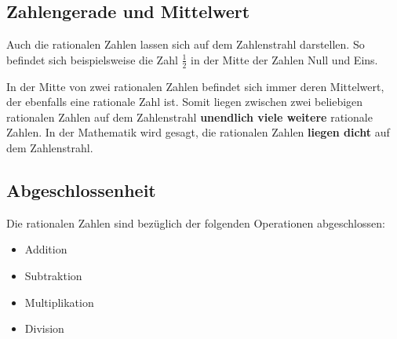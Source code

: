 \subsection{Zahlengerade und Mittelwert}

Auch die rationalen Zahlen lassen sich auf dem Zahlenstrahl darstellen. So befindet sich beispielsweise die Zahl $\frac{1}{2}$ in der Mitte der Zahlen Null und Eins.

\begin{center}
\end{center}

In der Mitte von zwei rationalen Zahlen befindet sich immer deren Mittelwert, der ebenfalls eine rationale Zahl ist. Somit liegen zwischen zwei beliebigen rationalen Zahlen auf dem Zahlenstrahl \textbf{unendlich viele weitere} rationale Zahlen. In der Mathematik wird gesagt, die rationalen Zahlen \textbf{liegen dicht} auf dem Zahlenstrahl.

\subsection{Abgeschlossenheit}

Die rationalen Zahlen sind bezüglich der folgenden Operationen abgeschlossen:

\begin{itemize}[noitemsep]
  \item Addition
  \item Subtraktion
  \item Multiplikation
  \item Division
\end{itemize}

